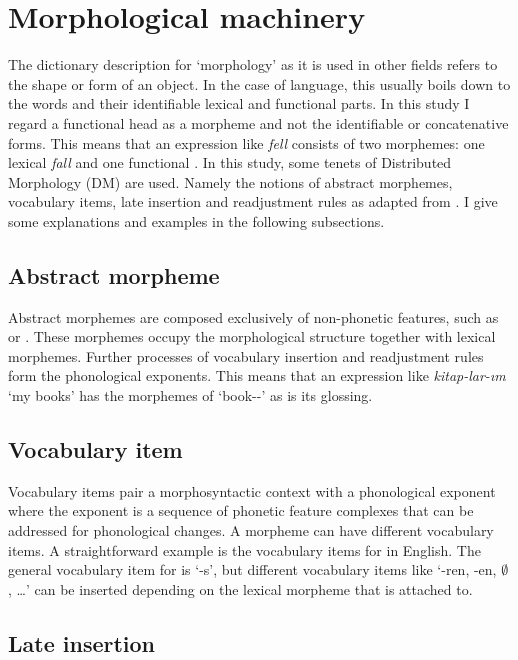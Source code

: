 \section{Morphological machinery}

The dictionary description for `morphology' as it is used in other fields refers to the shape or form of an object. In the case of language, this usually boils down to the words and their identifiable lexical and functional parts. In this study I regard a functional head as a morpheme and not the identifiable or concatenative forms. This means that an expression like \textit{fell} consists of two morphemes: one lexical \textit{fall} and one functional {\Pst}. In this study, some tenets of Distributed Morphology (DM) \citep{halle1993distributed, halle1994some} are used. Namely the notions of abstract morphemes, vocabulary items, late insertion and readjustment rules as adapted from \cite{embick2005status}. I give some explanations and examples in the following subsections.


\subsection{Abstract morpheme}

Abstract morphemes are composed exclusively of non-phonetic features, such as {\Pst} or {\Pl}. These morphemes occupy the morphological structure together with lexical morphemes. Further processes of vocabulary insertion and readjustment rules form the phonological exponents. This means that an expression like \textit{kitap-lar-ım} `my books' has the morphemes of `book-{\Pl}-{\Poss}' as is its glossing. 

\subsection{Vocabulary item}

Vocabulary items pair a morphosyntactic context with a phonological exponent where the exponent is a sequence of phonetic feature complexes that can be addressed for phonological changes. A morpheme can have different vocabulary items. A straightforward example is the vocabulary items for {\Pl} in English. The general vocabulary item for {\Pl} is `-s', but  different vocabulary items like `-ren, -en, $\emptyset$, \ldots' can be inserted depending on the lexical morpheme that {\Pl} is attached to.

\subsection{Late insertion}

